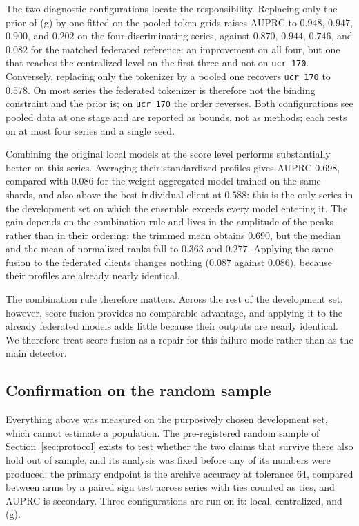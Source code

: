 \documentclass[conference]{IEEEtran}
\begin{document}
The two diagnostic configurations locate the responsibility. Replacing only the prior of (g) by one fitted on the pooled token grids raises AUPRC to $0.948$, $0.947$, $0.900$, and $0.202$ on the four discriminating series, against $0.870$, $0.944$, $0.746$, and $0.082$ for the matched federated reference: an improvement on all four, but one that reaches the centralized level on the first three and not on \texttt{ucr\_170}. Conversely, replacing only the tokenizer by a pooled one recovers \texttt{ucr\_170} to $0.578$. On most series the federated tokenizer is therefore not the binding constraint and the prior is; on \texttt{ucr\_170} the order reverses. Both configurations see pooled data at one stage and are reported as bounds, not as methods; each rests on at most four series and a single seed.

Combining the original local models at the score level performs substantially better on this series. Averaging their standardized profiles gives AUPRC $0.698$, compared with $0.086$ for the weight-aggregated model trained on the same shards, and also above the best individual client at $0.588$: this is the only series in the development set on which the ensemble exceeds every model entering it. The gain depends on the combination rule and lives in the amplitude of the peaks rather than in their ordering: the trimmed mean obtains $0.690$, but the median and the mean of normalized ranks fall to $0.363$ and $0.277$. Applying the same fusion to the federated clients changes nothing ($0.087$ against $0.086$), because their profiles are already nearly identical.

The combination rule therefore matters. Across the rest of the development set, however, score fusion provides no comparable advantage, and applying it to the already federated models adds little because their outputs are nearly identical. We therefore treat score fusion as a repair for this failure mode rather than as the main detector.

\subsection{Confirmation on the random sample}
\label{subsec:confirmation}

Everything above was measured on the purposively chosen development set, which cannot estimate a
population. The pre-registered random sample of Section~\ref{sec:protocol} exists to test whether
the two claims that survive there also hold out of sample, and its analysis was fixed before any of
its numbers were produced: the primary endpoint is the archive accuracy at tolerance $64$, compared
between arms by a paired sign test across series with ties counted as ties, and AUPRC is secondary.
Three configurations are run on it: local, centralized, and (g).
\end{document}
